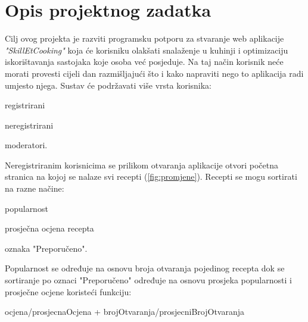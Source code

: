 \chapter{Opis projektnog zadatka}

Cilj ovog projekta je razviti programsku potporu za stvaranje web aplikacije \textit{"SkillEtCooking"} koja će korisniku olakšati snalaženje u kuhinji i optimizaciju iskorištavanja sastojaka koje osoba već posjeduje. Na taj način korisnik neće morati provesti cijeli dan razmišljajući što i kako napraviti nego to aplikacija radi umjesto njega.
\newline Sustav će podržavati više vrsta korisnika:
\begin{packed_item}
	\item registrirani
	\item neregistrirani
	\item moderatori.
\end{packed_item}

Neregistriranim korisnicima se prilikom otvaranja aplikacije otvori početna stranica na kojoj se nalaze svi recepti (\ref{fig:promjene}). Recepti se mogu sortirati na razne načine:

\begin{packed_item}
	\item popularnost
	\item prosječna ocjena recepta
	\item oznaka "Preporučeno".
\end{packed_item}

Popularnost se određuje na osnovu broja otvaranja pojedinog recepta dok se sortiranje po oznaci "Preporučeno" određuje na osnovu prosjeka popularnosti i prosječne ocjene koristeći funkciju:

\begin{packed_item}
	\item ocjena/prosjecnaOcjena + brojOtvaranja/prosjecniBrojOtvaranja
\end{packed_item}

